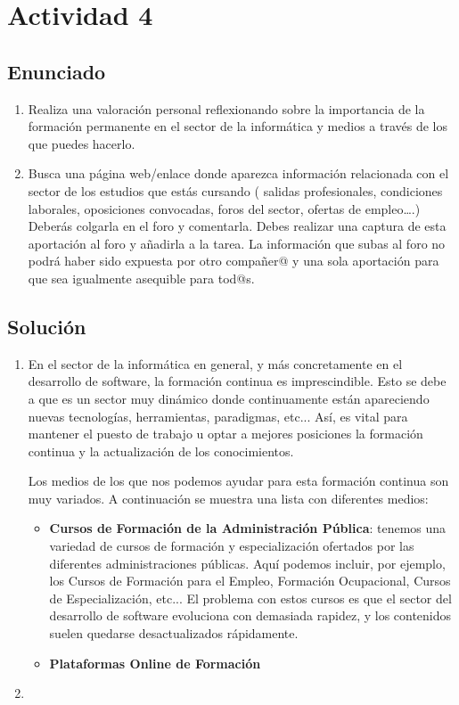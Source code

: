 \section{Actividad 4}
\subsection{Enunciado}

\begin{enumerate}[label={(\alph*)}]
    \item Realiza una valoración personal reflexionando sobre la importancia de la formación permanente en el sector de la informática y medios a través de los que puedes hacerlo.
    \item Busca una página web/enlace donde aparezca información relacionada con el sector de los estudios que estás cursando ( salidas profesionales, condiciones laborales, oposiciones convocadas,  foros del sector, ofertas de empleo….) Deberás colgarla en el foro y  comentarla. Debes realizar una captura de esta aportación al foro y añadirla a la tarea. La información que subas al foro no podrá haber sido expuesta por otro compañer@ y una sola aportación para que sea igualmente asequible para tod@s.
\end{enumerate}

\subsection{Solución}

\begin{enumerate}[label={(\alph*)}]
    \item En el sector de la informática en general, y más concretamente en el desarrollo de software, la formación continua es imprescindible. Esto se debe a que es un sector muy dinámico donde continuamente están apareciendo nuevas tecnologías, herramientas, paradigmas, etc... Así, es vital para mantener el puesto de trabajo u optar a mejores posiciones la formación continua y la actualización de los conocimientos.

    Los medios de los que nos podemos ayudar para esta formación continua son muy variados. A continuación se muestra una lista con diferentes medios:
    \begin{itemize}
        \item \textbf{Cursos de Formación de la Administración Pública}: tenemos una variedad de cursos de formación y especialización ofertados por las diferentes administraciones públicas. Aquí podemos incluir, por ejemplo, los Cursos de Formación para el Empleo, Formación Ocupacional, Cursos de Especialización, etc... El problema con estos cursos es que el sector del desarrollo de software evoluciona con demasiada rapidez, y los contenidos suelen quedarse desactualizados rápidamente.

        \item \textbf{Plataformas Online de Formación}
    \end{itemize}
    \item
\end{enumerate}










\newpage



